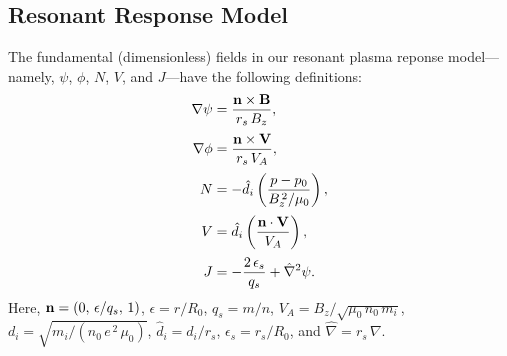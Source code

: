 \documentclass[12pt,prb,aps]{revtex4-1}
\begin{document}
\subsection{Resonant Response Model}\label{resonant}
The fundamental (dimensionless) fields in our resonant plasma reponse model---namely, $\psi$, $\phi$, $N$, $V$, and $J$---have the following
definitions:
\begin{align}\label{e10}
\nabla\psi &= \frac{{\bf n}\times{\bf B}} {r_s\,B_z},\\[0.5ex]
\nabla\phi &= \frac{{\bf n}\times {\bf V}}{r_s\,V_A},\\[0.5ex]
N &=-\hat{d}_i\left(\frac{p-p_0}{B_z^{\,2}/\mu_0}\right),\\[0.5ex]
V &= \hat{d}_i\left(\frac{{\bf n}\cdot {\bf V}}{V_A}\right),\label{e13}\\[0.5ex]
J&=-\frac{2\,\epsilon_s}{q_s}+\hat{\nabla}^2\psi.
\end{align}
Here,   ${\bf n} = (0,\,\epsilon/q_s,\,1)$, $\epsilon = r/R_0$, $q_s=m/n$, 
$V_A =B_z/\sqrt{\mu_0\,n_0\,m_i}$, 
$d_i = \sqrt{m_i/(n_0\,e^{\,2}\,\mu_0)}$,  $\hat{d}_i=d_i/r_s$, 
$\epsilon_s=r_s/R_0$, and $\hat{\nabla} = r_s\,\nabla$. 
\end{document}
